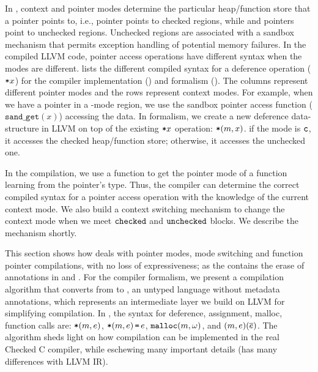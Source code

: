In \systemname, context and pointer modes determine the particular heap/function store that a pointer points to,
i.e., \cmode pointer points to checked regions, while \tmode and \umode pointers point to unchecked regions.
Unchecked regions are associated with a sandbox mechanism that permits exception handling of potential memory failures.
In the compiled LLVM code, pointer access operations have different syntax when the modes are different.
 lists the different compiled syntax for a deference operation ($\texttt{*}{x}$) for the compiler implementation () and formalism (). The columns represent different pointer modes and the rows represent context modes.
For example, when we have a \tmode pointer in a \cmode-mode region, we use the sandbox pointer access function ($\texttt{sand\_get}(x)$) accessing the data. In formalism, we create a new deference data-structure in LLVM on top of the existing $\texttt{*}{x}$ operation: $\texttt{*}({m},{x})$. if the mode is $\texttt{c}$, it accesses the checked heap/function store; otherwise, it accesses the unchecked one.

In the compilation, we use a function  to get the pointer mode of a function learning from the pointer's type.
Thus, the compiler can determine the correct compiled syntax for a pointer access operation with 
the knowledge of the current context mode.
We also build a context switching mechanism to change 
the context mode when we meet $\mathtt{checked}$ and $\mathtt{unchecked}$ blocks.
We describe the mechanism shortly.

This section shows how \systemname deals with pointer modes, mode switching and function pointer compilations, 
with no loss of expressiveness;
as the \checkedc contains the erase of annotations in \cite{li22checkedc} and .
For the compiler formalism, 
we present a compilation algorithm that converts from
\systemname to \elang, an untyped language without metadata
annotations, which represents an intermediate layer we build on LLVM for simplifying compilation. 
In \elang, the syntax for deference, assignment, malloc, function calls are: $\texttt{*}({m},{e})$, $\texttt{*}{(m,e)}\,\texttt{=}\, {e}$, 
$\mathtt{malloc}({m},{\omega})$, and ${(m,e)}({\overline{e}})$.
The algorithm sheds
  light on how compilation can be implemented in the real Checked C
  compiler, while eschewing many important details (\elang has many 
  differences with LLVM IR).


